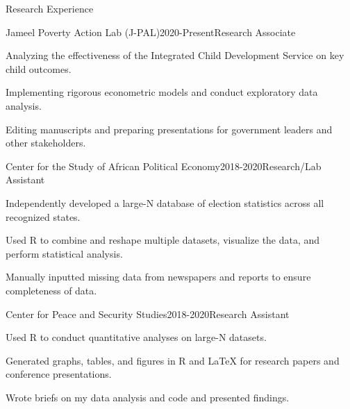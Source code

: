 \documentclass[10pt]{resume} %
\begin{document}
	\begin{rSection}{Research Experience}
		
		\begin{rSubsection}{Jameel Poverty Action Lab (J-PAL)}{2020-Present}{Research Associate}{}
		\item Analyzing the effectiveness of the Integrated Child Development Service on key child outcomes.  
		\item Implementing rigorous econometric models and conduct exploratory data analysis.
		\item Editing manuscripts and preparing presentations for government leaders and other stakeholders.
		\end{rSubsection}
		
		\begin{rSubsection}{Center for the Study of African Political Economy}{2018-2020}{Research/Lab Assistant}{}
			\item Independently developed a large-N database of election statistics across all recognized states.
			\item Used R to combine and reshape multiple datasets, visualize the data, and perform statistical analysis.
			\item Manually inputted missing data from newspapers and reports to ensure completeness of data. 
		\end{rSubsection}
		
		\begin{rSubsection}{Center for Peace and Security Studies}{2018-2020}{Research Assistant}{}
			\item Used R to conduct quantitative analyses on large-N datasets.
			\item Generated graphs, tables, and figures in R and LaTeX for research papers and conference presentations.
			\item Wrote briefs on my data analysis and code and presented findings. 
			
		\end{rSubsection}
		
		

\end{rSection}
\end{document}
